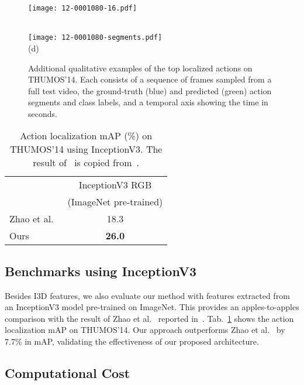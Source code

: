 \documentclass[10pt,twocolumn,letterpaper]{article}
\newcommand\Tstrut{\rule{0pt}{2.2ex}}       \newcommand\Bstrut{\rule[-1.0ex]{0pt}{0pt}} \newcommand{\TBstrut}{\Tstrut\Bstrut}
\begin{document}
\begin{figure*}[t]
 \begin{minipage}{0.058\textwidth} \centering \texttt{[image: 12-0001080-16.pdf]} \end{minipage}
 \\ \vspace{2mm}
 \texttt{[image: 12-0001080-segments.pdf]}
 \\
 (d)
\caption{\small Additional qualitative examples of the top localized actions
on THUMOS'14. Each consists of a sequence of frames sampled from a full test
video, the ground-truth (blue) and predicted (green) action segments and class
labels, and a temporal axis showing the time in seconds.}
 \label{fig:additional-2}
\end{figure*}

\begin{table}[t]
\centering
\begin{tabular}{lc}
  \hline \TBstrut
  \multirow{2}{*}{}                & InceptionV3 RGB        \\
                                   & (ImageNet pre-trained) \\
  \hline \Tstrut
  Zhao et al.~\cite{zhao:iccv2017} &  18.3                  \\ \Bstrut
  Ours                             &  \textbf{26.0}         \\
  \hline
 \end{tabular}
 \vspace{-2mm}
 \caption{\small Action localization mAP (\%) on THUMOS'14 using InceptionV3.
The result of~\cite{zhao:iccv2017} is copied from~\cite{yjxiong:code}.}
\label{tab:map}
\end{table}

\subsection{Benchmarks using InceptionV3}

Besides I3D features, we also evaluate our method with features extracted from
an InceptionV3 model pre-trained on ImageNet. This provides an apples-to-apples
comparison with the result of Zhao et al.~\cite{zhao:iccv2017} reported
in~\cite{yjxiong:code}. Tab.~\ref{tab:map} shows the action localization mAP on
THUMOS'14. Our approach outperforms Zhao et al.~\cite{zhao:iccv2017} by 7.7\%
in mAP, validating the effectiveness of our proposed architecture.

\subsection{Computational Cost}
\end{document}
